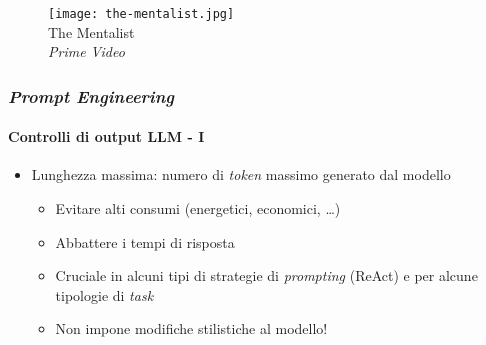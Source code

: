 \begin{frame}[t]
{\begin{minipage}[t]{\textwidth}
\begin{minipage}[t]{0.6\textwidth}
\begin{itemize}[leftmargin=10pt,align=right]
				\end{itemize}
            \end{minipage}
			\hfill
            \begin{minipage}[t]{0.4\textwidth}
                \centering
                \begin{figure}[ht]
                    \texttt{[image: the-mentalist.jpg]}
                    {\tiny\\The Mentalist\\\vspace*{-1pt}\textit{\textcopyright Prime Video}}
                \end{figure}
            \end{minipage}
	    \end{minipage}
	}
\end{frame}
%
\begin{frame}[t] \frametitle{\emph{Prompt Engineering}}
\framesubtitle{Controlli di output LLM - I}
{\small
    \begin{minipage}[t]{\textwidth}
        \begin{itemize}[leftmargin=10pt,align=right]
            \item[\alertedcircled{1}] \alert{Lunghezza massima:} numero di \emph{token} massimo generato dal modello
            \begin{itemize}[leftmargin=10pt,align=right]
                \item[\alert{\faArrowCircleRight}] Evitare alti consumi (energetici, economici, \ldots)
                \item[\alert{\faArrowCircleRight}] Abbattere i tempi di risposta
                \item[\alert{\faArrowCircleRight}] Cruciale in alcuni tipi di strategie di \textit{prompting} (ReAct) e per alcune tipologie di \textit{task}
                \item[\alert{\faExclamationTriangle}] \alert{Non} impone modifiche stilistiche al modello!
            \end{itemize}
        \end{itemize}
    \end{minipage}
}
\end{frame}
%
